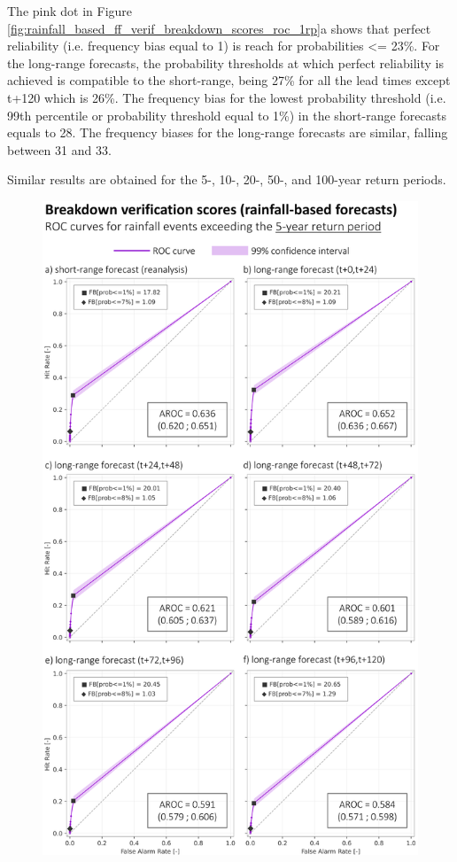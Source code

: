 The pink dot in Figure \ref{fig:rainfall_based_ff_verif_breakdown_scores_roc_1rp}a shows that perfect reliability (i.e. frequency bias equal to 1) is reach for probabilities <= 23\%. For the long-range forecasts, the probability thresholds at which perfect reliability is achieved is compatible to the short-range, being 27\% for all the lead times except t+120 which is 26\%. The frequency bias for the lowest probability threshold (i.e. 99th percentile or probability threshold equal to 1\%) in the short-range forecasts equals to 28. The frequency biases for the long-range forecasts are similar, falling between 31 and 33. 

Similar results are obtained for the 5-, 10-, 20-, 50-, and 100-year return periods.

\begin{figure}[htbp]
\centering
\includegraphics[width=\textwidth]{chapter_05/figures/rainfall_based_ff_verif_breakdown_scores_roc_5rp.png}

\end{figure}
